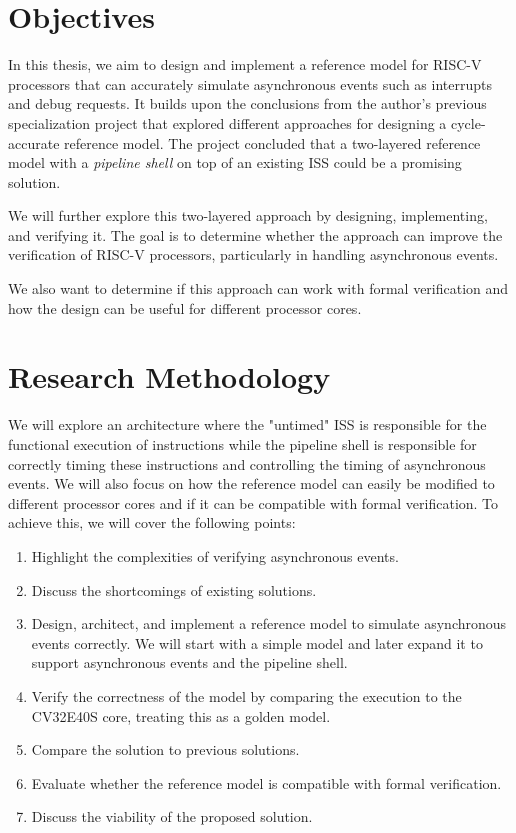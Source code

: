 \section{Objectives}




In this thesis, we aim to design and implement a reference model for RISC-V processors that can accurately simulate asynchronous events such as interrupts and debug requests. It builds upon the conclusions from the author's previous specialization project \cite{torjenygaardeikenesDesigningRISCVReference2023} that explored different approaches for designing a cycle-accurate reference model. 
The project concluded that a two-layered reference model with a \textit{pipeline shell} on top of an existing ISS could be a promising solution. 

We will further explore this two-layered approach by designing, implementing, and verifying it. The goal is to determine whether the approach can improve the verification of RISC-V processors, particularly in handling asynchronous events. 

We also want to determine if this approach can work with formal verification and how the design can be useful for different processor cores.


\section{Research Methodology}

We will explore an architecture where the "untimed" ISS is responsible for the functional execution of instructions while the pipeline shell is responsible for correctly timing these instructions and controlling the timing of asynchronous events. We will also focus on how the reference model can easily be modified to different processor cores and if it can be compatible with formal verification.  
To achieve this, we will cover the following points:
\begin{raggedright}
\begin{enumerate}
    \item Highlight the complexities of verifying asynchronous events. 
    \item Discuss the shortcomings of existing solutions.
    \item Design, architect, and implement a reference model to simulate asynchronous events correctly. We will start with a simple model and later expand it to support asynchronous events and the pipeline shell.
    \item Verify the correctness of the model by comparing the execution to the CV32E40S core, treating this as a golden model.
    \item Compare the solution to previous solutions.
    \item Evaluate whether the reference model is compatible with formal verification.
    \item Discuss the viability of the proposed solution.
\end{enumerate}
\end{raggedright}

